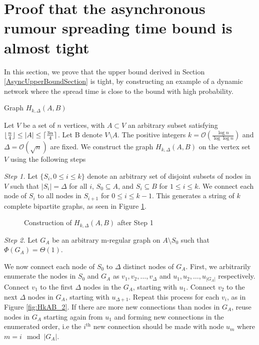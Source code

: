 \section{Proof that the asynchronous rumour spreading time bound is almost tight}
\label{section:AsyncLowerBound}

In this section, we prove that the upper bound derived in Section \ref{AsyncUpperBoundSection} is tight, by constructing an example of a dynamic network where the spread time is close to the bound with high probability.

\begin{definition}\label{def:HkAB}
 	Graph $H_{k, \Delta}(A,B)$

	Let $V$ be a set of $n$ vertices, with $A \subset V$ an arbitrary subset satisfying $\lfloor\frac{n}{4}\rfloor \leq |A| \leq \lceil\frac{3n}{4}\rceil$. %
	Let B denote $V \setminus A$. The positive integers $k = \mathcal{O}\left(\frac{\log n}{\log \log n}\right)$ and $\Delta = \mathcal{O}(\sqrt{n})$ are fixed. We construct the graph $H_{k, \Delta}(A,B)$ on the vertex set $V$ using the following steps


	\textit{Step 1.} Let $\{S_i, 0 \leq i \leq k\}$ denote an arbitrary set of disjoint subsets of nodes in $V$ such that $|S_i| = \Delta$ for all $i$, $S_0 \subseteq A$, and $S_i \subseteq B$ for $1 \leq i \leq k$. We connect each node of $S_i$ to all nodes in $S_{i+1}$ for $0 \leq i \leq k - 1$. This generates a string of $k$ complete bipartite graphs, as seen in Figure \ref{fig:HkAB_1}.


    \begin{figure}[h]
        \centering
        
        \caption{Construction of $H_{k, \Delta}(A,B)$ after Step 1}
        \label{fig:HkAB_1}
    \end{figure}
    
	\textit{Step 2.} Let $G_A$ be an arbitrary m-regular %
	graph on $A \setminus S_0$ such that $\Phi(G_A) = \Theta(1)$. %


	We now connect each node of $S_0$ to $\Delta$ distinct nodes of $G_A$. First, we arbitrarily enumerate the nodes in $S_0$ and $G_A$ as $v_1, v_2, \dots, v_\Delta$ and $u_1, u_2, \dots, u_{|G_A|}$ respectively. Connect $v_1$ to the first $\Delta$ nodes in the $G_A$, starting with $u_1$. Connect $v_2$ to the next $\Delta$ nodes in $G_A$, starting with $u_{\Delta + 1}$.
	Repeat this process for each $v_i$, as in Figure \ref{fig:HkAB_2}.
	If there are more new connections than nodes in $G_A$, reuse nodes in $G_A$ starting again from $u_1$ and forming new connections in the enumerated order, i.e the $i^\text{th}$ new connection should be made with node $u_m$ where $m = i\mod |G_A|$.


\end{definition}
